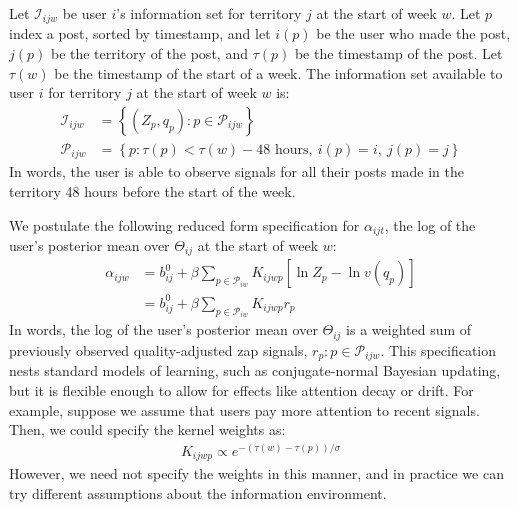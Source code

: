 Let $\mathcal{I}_{ijw}$ be user $i$'s information set for territory $j$ at the start of week $w$. Let $p$ index a post, sorted by timestamp, and let $i(p)$ be the user who made the post, $j(p)$ be the territory of the post, and $\tau(p)$ be the timestamp of the post. Let $\tau(w)$ be the timestamp of the start of a week. The information set available to user $i$ for territory $j$ at the start of week $w$ is:
\begin{align}
\mathcal{I}_{ijw} &= \left\{ (Z_p, q_p):p\in \mathcal{P}_{ijw} \right\}\\
\mathcal{P}_{ijw} &= \left\{ p: \tau(p) < \tau(w) - \text{48 hours}, ~ i(p)=i, ~j(p)=j \right\}
\end{align}
In words, the user is able to observe signals for all their posts made in the territory 48 hours before the start of the week.

We postulate the following reduced form specification for $\alpha_{ijt}$, the log of the user's posterior mean over $\Theta_{ij}$ at the start of week $w$:
\begin{align}
\alpha_{ijw} &= b^0_{ij} + \beta \sum_{p \in \mathcal{P}_{iw}} K_{ijwp} \left[ \ln Z_p - \ln v(q_p) \right] \nonumber \\
& = b^0_{ij} + \beta \sum_{p \in \mathcal{P}_{iw}} K_{ijwp} r_{p} 
\end{align}
In words, the log of the user's posterior mean over $\Theta_{ij}$ is a weighted sum of previously observed quality-adjusted zap signals, $r_p : p\in \mathcal{P}_{ijw}$. This specification nests standard models of learning, such as conjugate-normal Bayesian updating, but it is flexible enough to allow for effects like attention decay or drift. For example, suppose we assume that users pay more attention to recent signals. Then, we could specify the kernel weights as:
\begin{align}
K_{ijwp} \propto e^{-(\tau(w) - \tau(p))/\sigma} 
\end{align}
However, we need not specify the weights in this manner, and in practice we can try different assumptions about the information environment.

